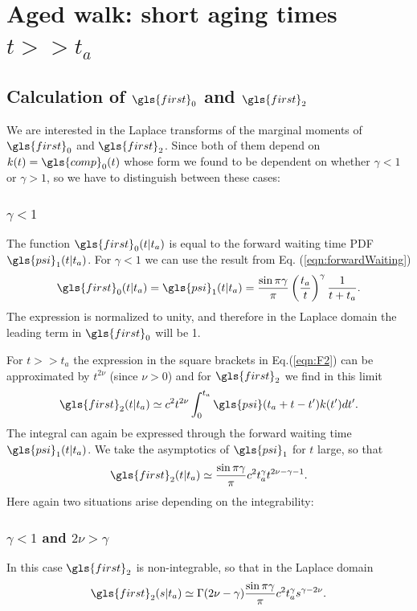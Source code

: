 \section{Aged walk: short aging times $t>> t_a$}

\subsection*{Calculation of $\gls{first}_0$ and $\gls{first}_2$}

We are interested in the Laplace transforms of the marginal moments of $\gls{first}_0$ and $\gls{first}_2$. Since both of them depend on $k(t)=\gls{comp}_0(t)$ 
whose form we found to be dependent on whether $\gamma<1$ or $\gamma>1$, so we have to distinguish between these cases:

\subsubsection{$\gamma<1$}
The function $\gls{first}_0(t|t_a)$ is equal to the forward waiting time PDF $\gls{psi}_1(t|t_a)$. For $\gamma<1$ we can use the result from Eq. (\ref{eqn:forwardWaiting})
\begin{equation}
 \gls{first}_0(t|t_a) = \gls{psi}_1(t|t_a) = \frac{\sin \pi \gamma}{\pi} \left( \frac{t_a}{t}\right)^\gamma \frac{1}{t+t_a}. \label{eqn:psi1}
\end{equation}
The expression is normalized to unity, and therefore in the Laplace domain the leading term in $\gls{first}_0$ will be 1. 

For $t>>t_a$ the expression in the square brackets in Eq.(\ref{eqn:F2}) can be approximated by $t^{2\nu}$ (since $\nu > 0$) and for $\gls{first}_2$ we find in this limit
\begin{equation}
 \gls{first}_2(t|t_a) \simeq  c^2 t^{2\nu} \int_0^{t_a} \gls{psi}(t_a+t-t') k(t') dt'.
\end{equation}
The integral can again be expressed through the forward waiting time $\gls{psi}_1(t|t_a)$. We take the asymptotics of $\gls{psi}_1$ for $t$ large, so that 
\begin{equation}
\gls{first}_2(t|t_a) \simeq \frac{\sin \pi \gamma}{\pi} c^2  t_a^\gamma t^{2\nu-\gamma -1}  .  
\end{equation}
Here again two situations arise depending on the integrability: 

\subsubsection{$\gamma <1$ and  $2 \nu > \gamma$}
In this case $\gls{first}_2$ is non-integrable, so that in the Laplace domain
\begin{equation}
 \gls{first}_2(s|t_a) \simeq \Gamma(2\nu-\gamma) \frac{\sin \pi \gamma}{\pi} c^2 t_a^\gamma s^{\gamma - 2\nu}.
\end{equation}

